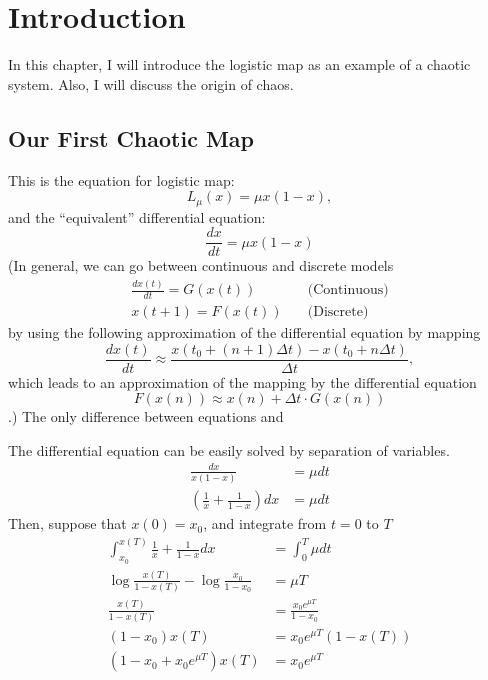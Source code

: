 \documentclass[12pt,twoside]{book}
\begin{document}
\chapter{Introduction}
In this chapter, I will introduce the logistic map as an example of a chaotic system.
Also, I will discuss the origin of chaos.

\section{Our First Chaotic Map}
This is the equation for logistic map:
\begin{equation}
  L_{\mu}(x) = \mu x(1-x),
  \label{logistic}
\end{equation}
and the ``equivalent'' differential equation:
\begin{equation}
  \frac{dx}{dt} = \mu x(1-x)
  \label{logisticdiffeq}
\end{equation}
(In general, we can go between continuous and discrete models
\begin{align*}
  \frac{dx(t)}{dt} = G(x(t)) &\quad\mbox{(Continuous)} \\
  x(t + 1) = F(x(t)) &\quad\mbox{(Discrete)}
\end{align*}
by using the following approximation of the differential equation by mapping
\begin{equation*}
  \frac{dx(t)}{dt} \approx \frac{x(t_0 + (n+1)\Delta t) - x(t_0 + n \Delta t)}{\Delta t},
\end{equation*}
which leads to an approximation of the mapping by the differential equation
\begin{equation*}
  F(x(n)) \approx x(n) + \Delta t \cdot G(x(n))
\end{equation*}
.)
The only difference between equations  and 

The differential equation  can be easily solved by separation of variables.
\begin{align*}
  \frac{dx}{x(1-x)} &= \mu dt \\  
  \left( \frac{1}{x} + \frac{1}{1-x} \right) dx &= \mu dt
\end{align*}
Then, suppose that $x(0) = x_0$, and integrate from $t = 0$ to $T$
\begin{align*}
  \int_{x_0}^{x(T)} \frac{1}{x} + \frac{1}{1-x} dx &= \int_0^T \mu dt \\
  \log{\frac{x(T)}{1-x(T)}} - \log{\frac{x_0}{1-x_0}} &= \mu T \\
  \frac{x(T)}{1-x(T)} &= \frac{x_0 e^{\mu T}}{1-x_0} \\
  (1-x_0)x(T) &= x_0 e^{\mu T} (1-x(T)) \\
  (1-x_0 + x_0 e^{\mu T})x(T) &= x_0 e^{\mu T}
\end{align*}
\end{document}
